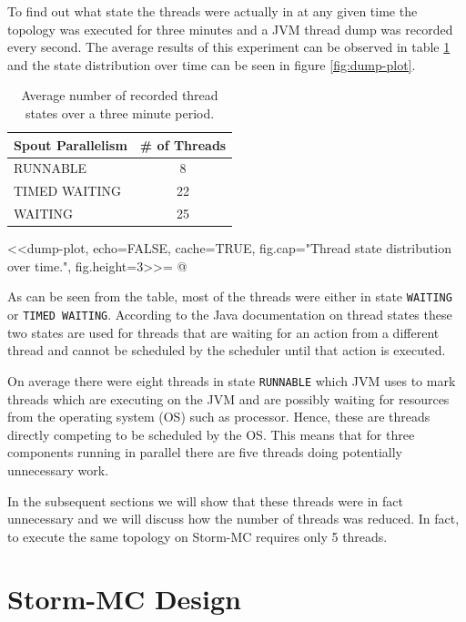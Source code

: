 To find out what state the threads were actually in at any given time the topology was executed for three minutes and a JVM thread dump was recorded every second. The average results of this experiment can be observed in table \ref{table:dump} and the state distribution over time can be seen in figure \ref{fig:dump-plot}.

\begin{table}[h!]
\centering
\begin{tabular}{@{}lc@{}}
    \textbf{Spout Parallelism} & \textbf{\# of Threads} \\ \toprule
    RUNNABLE & 8  \\
	TIMED WAITING & 22  \\
    WAITING & 25  \\
\end{tabular}
\caption{Average number of recorded thread states over a three minute period.}
\label{table:dump}
\end{table}

<<dump-plot, echo=FALSE, cache=TRUE, fig.cap="Thread state distribution over time.", fig.height=3>>=
@

As can be seen from the table, most of the threads were either in state \texttt{WAITING} or \texttt{TIMED WAITING}. According to the Java documentation on thread states \cite{JavaThreads} these two states are used for threads that are waiting for an action from a different thread and cannot be scheduled by the scheduler until that action is executed.

On average there were eight threads in state \texttt{RUNNABLE} which JVM uses to mark threads which are executing on the JVM and are possibly waiting for resources from the operating system (OS) such as processor. Hence, these are threads directly competing to be scheduled by the OS. This means that for three components running in parallel there are five threads doing potentially unnecessary work.

In the subsequent sections we will show that these threads were in fact unnecessary and we will discuss how the number of threads was reduced. In fact, to execute the same topology on Storm-MC requires only 5 threads.

\section{Storm-MC Design}
\label{sec:storm_mc_arch}


